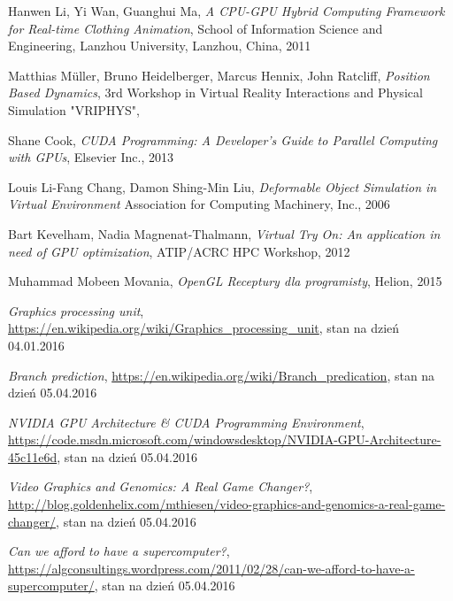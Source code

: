 \begin{thebibliography}{999}

 Hanwen Li, Yi Wan, Guanghui Ma, \emph{A CPU-GPU Hybrid Computing Framework for Real-time Clothing Animation}, School of Information Science and Engineering, Lanzhou University, Lanzhou, China, 2011

 Matthias Müller, Bruno Heidelberger, Marcus Hennix, John Ratcliff, \emph{Position Based Dynamics}, 3rd Workshop in Virtual Reality Interactions and Physical Simulation "VRIPHYS", 

 Shane Cook, \emph{CUDA Programming: A Developer's Guide to Parallel Computing with GPUs}, Elsevier Inc., 2013

 Louis Li-Fang Chang, Damon Shing-Min Liu, \emph{Deformable Object Simulation in Virtual Environment} Association for Computing Machinery, Inc., 2006

 Bart Kevelham, Nadia Magnenat-Thalmann, \emph{Virtual Try On: An application in need of GPU optimization}, ATIP/A\*CRC HPC Workshop, 2012

 Muhammad Mobeen Movania, \emph{OpenGL Receptury dla programisty}, Helion, 2015

 \emph{Graphics processing unit}, \href{https://en.wikipedia.org/wiki/Graphics\_processing\_unit}{https://en.wikipedia.org/wiki/Graphics\_processing\_unit}, stan na dzień 04.01.2016

 \emph{Branch prediction}, \href{https://en.wikipedia.org/wiki/Branch\_predication}{https://en.wikipedia.org/wiki/Branch\_predication}, stan na dzień 05.04.2016

 \emph{NVIDIA GPU Architecture \& CUDA Programming Environment}, \linebreak \href{https://code.msdn.microsoft.com/windowsdesktop/NVIDIA-GPU-Architecture-45c11e6d}{https://code.msdn.microsoft.com/windowsdesktop/NVIDIA-GPU-Architecture-45c11e6d}, stan na dzień 05.04.2016

 \emph{Video Graphics and Genomics: A Real Game Changer?}, \linebreak \href{http://blog.goldenhelix.com/mthiesen/video-graphics-and-genomics-a-real-game-changer/}{http://blog.goldenhelix.com/mthiesen/video-graphics-and-genomics-a-real-game-changer/}, stan na dzień 05.04.2016

 \emph{Can we afford to have a supercomputer?}, \linebreak \href{https://algconsultings.wordpress.com/2011/02/28/can-we-afford-to-have-a-supercomputer/}{https://algconsultings.wordpress.com/2011/02/28/can-we-afford-to-have-a-supercomputer/}, stan na dzień 05.04.2016


\end{thebibliography}
